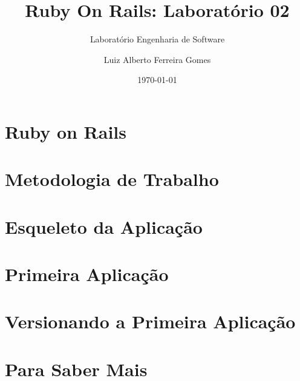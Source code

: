 \documentclass[t, 				             
			   final,
			   12pt, 				         
			   xcolor={usenames,dvipsnames}, 
			   table]{beamer}
\begin{document}
\author{Luiz Alberto Ferreira Gomes}
\title{Ruby On Rails: Laboratório 02}
\subtitle{Laboratório Engenharia de Software}
\date{\today}

	
	  	
    
    \section{Ruby on Rails}
		
	
    
    \section{Metodologia de Trabalho}
    

    \section{Esqueleto da Aplicação}
    
   
    \section{Primeira Aplicação}
    
    
    

    \section{Versionando a Primeira Aplicação}
    
        
    
    \section{Para Saber Mais}
	
\end{document}
